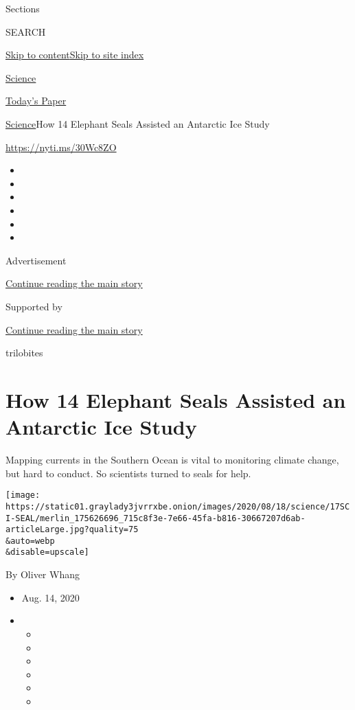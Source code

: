 Sections

SEARCH

\protect\hyperlink{site-content}{Skip to
content}\protect\hyperlink{site-index}{Skip to site index}

\href{https://www.nytimes3xbfgragh.onion/section/science}{Science}

\href{https://myaccount.nytimes3xbfgragh.onion/auth/login?response_type=cookie\&client_id=vi}{}

\href{https://www.nytimes3xbfgragh.onion/section/todayspaper}{Today's
Paper}

\href{/section/science}{Science}\textbar{}How 14 Elephant Seals Assisted
an Antarctic Ice Study

\url{https://nyti.ms/30Wc8ZO}

\begin{itemize}
\item
\item
\item
\item
\item
\item
\end{itemize}

Advertisement

\protect\hyperlink{after-top}{Continue reading the main story}

Supported by

\protect\hyperlink{after-sponsor}{Continue reading the main story}

trilobites

\hypertarget{how-14-elephant-seals-assisted-an-antarctic-ice-study}{%
\section{How 14 Elephant Seals Assisted an Antarctic Ice
Study}\label{how-14-elephant-seals-assisted-an-antarctic-ice-study}}

Mapping currents in the Southern Ocean is vital to monitoring climate
change, but hard to conduct. So scientists turned to seals for help.

\texttt{[image: https://static01.graylady3jvrrxbe.onion/images/2020/08/18/science/17SCI-SEAL/merlin\_175626696\_715c8f3e-7e66-45fa-b816-30667207d6ab-articleLarge.jpg?quality=75\\\&auto=webp\\\&disable=upscale]}

By Oliver Whang

\begin{itemize}
\item
  Aug. 14, 2020
\item
  \begin{itemize}
  \item
  \item
  \item
  \item
  \item
  \item
  \end{itemize}
\end{itemize}

